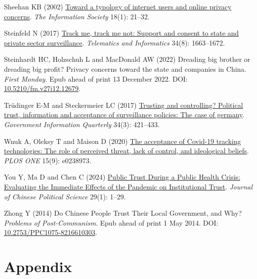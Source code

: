 \documentclass[
  letterpaper,
  DIV=11,
  numbers=noendperiod]{scrartcl}
\newlength{\cslhangindent}
\newenvironment{CSLReferences}[2] %
 {\begin{list}{}{%
  \setlength{\itemindent}{0pt}
  \setlength{\leftmargin}{0pt}
  \setlength{\parsep}{0pt}
  \ifodd #1
   \setlength{\leftmargin}{\cslhangindent}
   \setlength{\itemindent}{-1\cslhangindent}
  \fi
  \setlength{\itemsep}{#2\baselineskip}}}
 {\end{list}}
\begin{document}
\begin{CSLReferences}{1}{1}
Sheehan KB (2002)
\href{https://doi.org/10.1080/01972240252818207}{Toward a typology of
internet users and online privacy concerns}. \emph{The Information
Society} 18(1): 21--32.

Steinfeld N (2017)
\href{https://doi.org/10.1016/j.tele.2017.07.012}{Track me, track me
not: Support and consent to state and private sector surveillance}.
\emph{Telematics and Informatics} 34(8): 1663--1672.

Steinhardt HC, Holzschuh L and MacDonald AW (2022) Dreading big brother
or dreading big profit? Privacy concerns toward the state and companies
in China. \emph{First Monday}. Epub ahead of print 13 December 2022.
DOI:
\href{https://doi.org/10.5210/fm.v27i12.12679}{10.5210/fm.v27i12.12679}.

Trüdinger E-M and Steckermeier LC (2017)
\href{https://doi.org/10.1016/j.giq.2017.07.003}{Trusting and
controlling? Political trust, information and acceptance of surveillance
policies: The case of germany}. \emph{Government Information Quarterly}
34(3): 421--433.

Wnuk A, Oleksy T and Maison D (2020)
\href{https://doi.org/10.1371/journal.pone.0238973}{The acceptance of
Covid-19 tracking technologies: The role of perceived threat, lack of
control, and ideological beliefs}. \emph{PLOS ONE} 15(9): e0238973.

You Y, Ma D and Chen C (2024)
\href{https://doi.org/10.1007/s11366-023-09874-y}{Public Trust During a
Public Health Crisis: Evaluating the Immediate Effects of the Pandemic
on Institutional Trust}. \emph{Journal of Chinese Political Science}
29(1): 1--29.

Zhong Y (2014) Do Chinese People Trust Their Local Government, and Why?
\emph{Problems of Post-Communism}. Epub ahead of print 1 May 2014. DOI:
\href{https://doi.org/10.2753/PPC1075-8216610303}{10.2753/PPC1075-8216610303}.

\end{CSLReferences}

\newpage{}

\section{Appendix}\label{sec-appendix}
\end{document}
